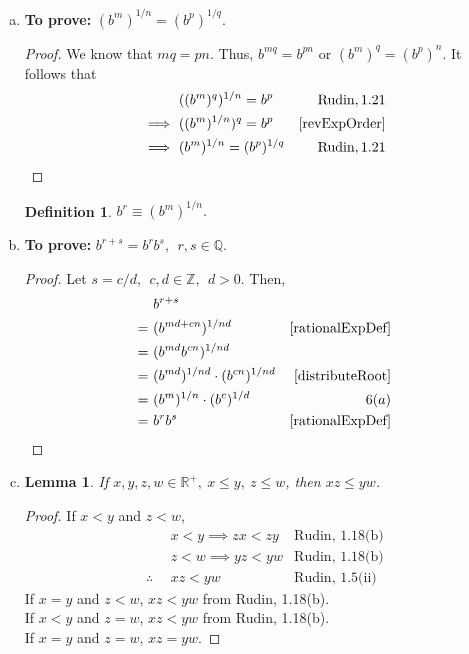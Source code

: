 \documentclass[12pt]{article}
\newtheorem{lemma}[theorem]{Lemma}
\newtheorem{definition}[theorem]{Definition}
\begin{document}
\begin {enumerate} [(a)]
\item
      {\bf To prove:}
$(b^m)^{1/n} = (b^p)^{1/q}$.

\begin{proof}
      We know that $mq = pn$. Thus, $b^{mq} = b^{pn}$ or $(b^m)^q = (b^p)^n$. It follows that
      \begin{align*}
                        & ((b^m)^q)^{1/n} = b^p     & \text{Rudin}, 1.21 \\
            \implies \  & ((b^m)^{1/n})^{q} = b^p   & \ref{revExpOrder}  \\
            \implies \  & (b^m)^{1/n} = (b^p)^{1/q} & \text{Rudin}, 1.21
      \end{align*}
\end{proof}
\begin{definition}
      \label{rationalExpDef}
      $b^r\equiv (b^m)^{1/n}$.
\end{definition}
\item
      {\bf To prove:}
$b^{r+s} = b^rb^s, \ \ r,s \in \mathbb{Q}$.

\begin{proof}
      Let $s = c/d, \ \  c, d \in \mathbb{Z},\ \  d>0$. Then,
      \begin{align*}
                 & b^{r+s}                                 &                      \\
            = \  & (b^{md+cn})^{1/{nd}}                    & \ref{rationalExpDef} \\
            = \  & (b^{md}b^{cn})^{1/{nd}}                 &                      \\
            = \  & (b^{md})^{1/{nd}}\cdot(b^{cn})^{1/{nd}} & \ref{distributeRoot} \\
            = \  & (b^{m})^{1/{n}}\cdot(b^{c})^{1/{d}}     & 6(a)                 \\
            = \  & b^rb^s                                  & \ref{rationalExpDef}
      \end{align*}
\end{proof}
\item


\begin{lemma}
      \label{ineqMul}
      If $x, y, z, w \in \mathbb{R}^+,\  x\le y,\ z \le w$, then $xz\le yw$.
\end{lemma}
\begin{proof}
      If $x<y$ and $z<w$,
      \begin{align*}
                           & x<y \implies zx<zy & \text{Rudin, 1.18(b)} \\
                           & z<w \implies yz<yw & \text{Rudin, 1.18(b)} \\
            \therefore\ \  & xz<yw              & \text{Rudin, 1.5(ii)}
      \end{align*}
      If $x=y$ and $z<w$, $xz<yw$ from Rudin, 1.18(b).\\
      If $x<y$ and $z=w$, $xz<yw$ from Rudin, 1.18(b).\\
      If $x=y$ and $z=w$, $xz=yw$.
\end{proof}



\end{enumerate}
\end{document}
